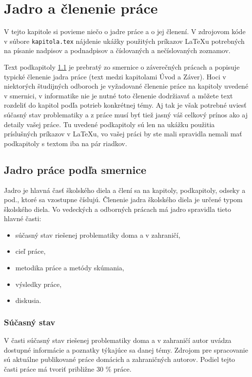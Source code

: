 \chapter{Jadro a členenie práce}

\label{kap:clenenie} %

V tejto kapitole si povieme niečo o jadre práce a o jej členení. V
zdrojovom kóde v súbore \verb'kapitola.tex' nájdenie ukážky použitých
príkazov LaTeXu potrebných na písanie nadpisov a podnadpisov a
číslovaných a nečíslovaných zoznamov.

Text podkapitoly \ref{sec:jadro} je
prebratý zo smernice o záverečných prácach  a popisuje typické členenie jadra práce (text medzi kapitolami Úvod a Záver). Hoci v niektorých študijných odboroch je vyžadované členenie práce na kapitoly uvedené v smernici, v informatike nie je nutné toto členenie dodržiavať a môžete text rozdeliť do kapitol podľa potrieb konkrétnej témy. Aj tak je však potrebné uviesť súčasný stav problematiky a z práce musí byť tiež jasný váš celkový prínos ako aj detaily vašej práce. Tu uvedené podkapitoly sú len na ukážku použitia príslušných príkazov v LaTeXu, vo vašej práci by ste mali spravidla nemali mať podkapitoly s textom iba na pár riadkov. 

\section{Jadro práce podľa smernice}
\label{sec:jadro}
Jadro je hlavná časť školského diela a člení sa na kapitoly,
podkapitoly, odseky a pod., ktoré sa vzostupne číslujú.
Členenie jadra školského diela je určené typom  školského diela. Vo vedeckých 
a odborných prácach má jadro spravidla tieto hlavné časti:
\begin{itemize}
\item  súčasný stav riešenej problematiky doma a v zahraničí,
\item  cieľ práce,
\item  metodika práce a metódy skúmania,
\item  výsledky práce, 
\item  diskusia. 
\end{itemize}

\subsection{Súčasný stav}
V časti súčasný stav riešenej problematiky doma a v zahraničí autor uvádza 
dostupné informácie a poznatky týkajúce sa danej témy. Zdrojom pre spracovanie sú 
aktuálne publikované práce domácich a zahraničných autorov.  Podiel tejto časti práce 
má tvoriť približne 30 \% práce.


